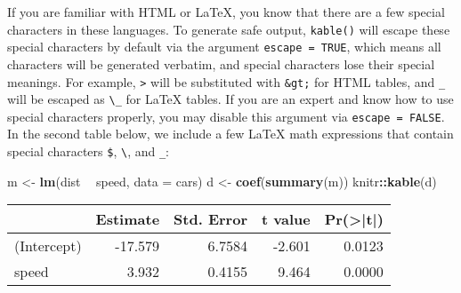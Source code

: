 \documentclass[
  11pt,
]{krantz}
\newenvironment{Shaded}{\begin{snugshade}}{\end{snugshade}}
\newcommand{\CharTok}[1]{\textcolor[rgb]{0.5,0.5,0.5}{#1}}
\newcommand{\CommentTok}[1]{\textcolor[rgb]{0.37,0.37,0.37}{\textit{#1}}}
\newcommand{\DataTypeTok}[1]{\textcolor[rgb]{0.27,0.27,0.27}{#1}}
\newcommand{\DecValTok}[1]{\textcolor[rgb]{0.06,0.06,0.06}{#1}}
\newcommand{\KeywordTok}[1]{\textcolor[rgb]{0.27,0.27,0.27}{\textbf{#1}}}
\newcommand{\NormalTok}[1]{#1}
\newcommand{\OperatorTok}[1]{\textcolor[rgb]{0.43,0.43,0.43}{\textbf{#1}}}
\newcommand{\OtherTok}[1]{\textcolor[rgb]{0.37,0.37,0.37}{#1}}
\newcommand{\StringTok}[1]{\textcolor[rgb]{0.5,0.5,0.5}{#1}}
\begin{document}
If you are familiar with HTML or LaTeX, you know that there are a few special characters in these languages. To generate safe output, \texttt{kable()} will escape these special characters by default via the argument \texttt{escape\ =\ TRUE}, which means all characters will be generated verbatim, and special characters lose their special meanings. For example, \texttt{\textgreater{}} will be substituted with \texttt{\&gt;} for HTML tables, and \texttt{\_} will be escaped as \texttt{\textbackslash{}\_} for LaTeX tables. If you are an expert and know how to use special characters properly, you may disable this argument via \texttt{escape\ =\ FALSE}. In the second table below, we include a few LaTeX math expressions that contain special characters \texttt{\$}, \texttt{\textbackslash{}}, and \texttt{\_}:

\begin{Shaded}
\begin{Highlighting}[]
\NormalTok{m <-}\StringTok{ }\KeywordTok{lm}\NormalTok{(dist }\OperatorTok{~}\StringTok{ }\NormalTok{speed, }\DataTypeTok{data =}\NormalTok{ cars)}
\NormalTok{d <-}\StringTok{ }\KeywordTok{coef}\NormalTok{(}\KeywordTok{summary}\NormalTok{(m))}
\NormalTok{knitr}\OperatorTok{::}\KeywordTok{kable}\NormalTok{(d)}
\end{Highlighting}
\end{Shaded}

\begin{tabular}{l|r|r|r|r}
\hline
  & Estimate & Std. Error & t value & Pr(>|t|)\\
\hline
(Intercept) & -17.579 & 6.7584 & -2.601 & 0.0123\\
\hline
speed & 3.932 & 0.4155 & 9.464 & 0.0000\\
\hline
\end{tabular}

\begin{Shaded}
\end{Shaded}
\end{document}
